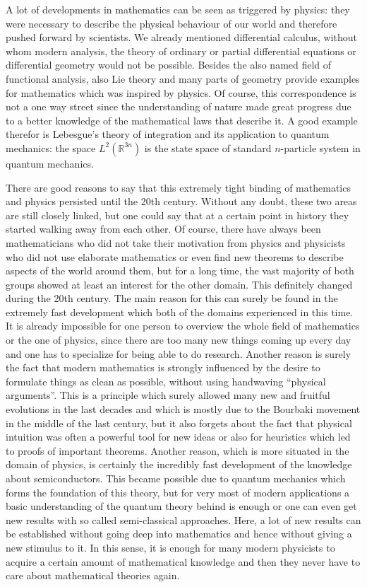 A lot of developments in mathematics can be seen as triggered by physics: they 
were necessary to describe the physical behaviour of our world and therefore 
pushed forward by scientists. We already mentioned differential calculus, 
without whom modern analysis, the theory of ordinary or partial differential 
equations or differential geometry would not be possible. Besides the also 
named field of functional analysis, also Lie theory and many parts of geometry 
provide examples for mathematics which was inspired by physics. Of course, this 
correspondence is not a one way street since the understanding of nature made 
great progress due to a better knowledge of the mathematical laws that describe 
it. A good example therefor is Lebesgue's theory of integration and its 
application to quantum mechanics: the space $L^2(\mathbb{R}^{3n})$ is the state 
space of standard $n$-particle system in quantum mechanics.


There are good reasons to say that this extremely tight binding of mathematics 
and physics persisted until the 20th century. Without any doubt, these two 
areas are still closely linked, but one could say that at a certain point in 
history they started walking away from each other. Of course, there have always 
been mathematicians who did not take their motivation from physics and 
physicists who did not use elaborate mathematics or even find new theorems to 
describe aspects of the world around them, but for a long time, the vast 
majority of both groups showed at least an interest for the other domain. This 
definitely changed during the 20th century. The main reason for this can 
surely be found in the extremely fast development which both of the domains 
experienced in this time. It is already impossible for one person to overview 
the whole field of mathematics or the one of physics, since there are too many 
new things coming up every day and one has to specialize for being able to do 
research. Another reason is surely the fact that modern mathematics is 
strongly influenced by the desire to formulate things as clean as possible, 
without using handwaving ``physical arguments''. This is a principle which 
surely allowed many new and fruitful evolutions in the last decades and which 
is mostly due to the Bourbaki movement in the middle of the last century, but 
it also forgets about the fact that physical intuition was often a powerful 
tool for new ideas or also for heuristics which led to proofs of important 
theorems. Another reason, which is more situated in the domain of physics, is 
certainly the incredibly fast development of the knowledge about 
semiconductors. This became possible due to quantum mechanics which forms the 
foundation of this theory, but for very most of modern applications a basic 
understanding of the quantum theory behind is enough or one can even get new 
results with so called semi-classical approaches. Here, a lot of new results 
can be established without going deep into mathematics and hence without giving 
a new stimulus to it. In this sense, it is enough for many modern physicists to 
acquire a certain amount of mathematical knowledge and then they never have to 
care about mathematical theories again.


